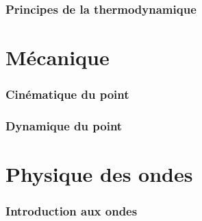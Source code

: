 \section{Principes de la thermodynamique}

\part{Mécanique}
\section{Cinématique du point}
\section{Dynamique du point}

\part{Physique des ondes}
\section{Introduction aux ondes}



